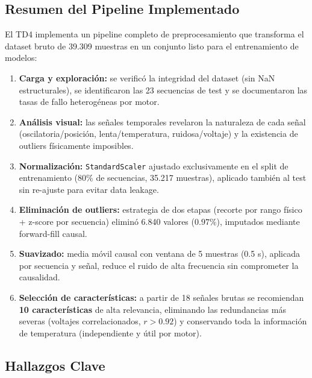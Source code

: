 \documentclass[12pt,a4paper]{article}
\begin{document}
\subsection{Resumen del Pipeline Implementado}

El TD4 implementa un pipeline completo de preprocesamiento que transforma el dataset
bruto de 39.309 muestras en un conjunto listo para el entrenamiento de modelos:

\begin{enumerate}[leftmargin=2em]
  \item \textbf{Carga y exploración:} se verificó la integridad del dataset
    (sin NaN estructurales), se identificaron las 23 secuencias de test y se
    documentaron las tasas de fallo heterogéneas por motor.

  \item \textbf{Análisis visual:} las señales temporales revelaron la naturaleza de
    cada señal (oscilatoria/posición, lenta/temperatura, ruidosa/voltaje) y la
    existencia de outliers físicamente imposibles.

  \item \textbf{Normalización:} \texttt{StandardScaler} ajustado exclusivamente en
    el split de entrenamiento (80\% de secuencias, 35.217 muestras), aplicado también
    al test sin re-ajuste para evitar data leakage.

  \item \textbf{Eliminación de outliers:} estrategia de dos etapas (recorte por rango
    físico + z-score por secuencia) eliminó 6.840 valores ($0.97\%$), imputados
    mediante forward-fill causal.

  \item \textbf{Suavizado:} media móvil causal con ventana de 5 muestras (0.5 s),
    aplicada por secuencia y señal, reduce el ruido de alta frecuencia sin
    comprometer la causalidad.

  \item \textbf{Selección de características:} a partir de 18 señales brutas se
    recomiendan \textbf{10 características} de alta relevancia, eliminando las
    redundancias más severas (voltajes correlacionados, $r > 0.92$) y conservando
    toda la información de temperatura (independiente y útil por motor).
\end{enumerate}

\subsection{Hallazgos Clave}
\end{document}
